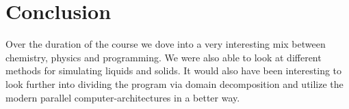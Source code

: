 \chapter{Conclusion}
\begin{comment}
- give look at stuff i did and did not
- mention all the other cool stuff, parralell hardware memes domain decompasition looking at other mechanical parameters ia stress
- should be written nice if i wanna work with those guys
-btw the github is actually hilarious although a c++ project over 80%
- personal ?!
\end{comment}

Over the duration of the course we dove into a very interesting mix between chemistry, physics and programming. We were also able to look at different methods for simulating liquids and solids. It would also have been interesting to look further into dividing the program via domain decomposition and utilize the modern parallel computer-architectures in a better way. 
\par 
